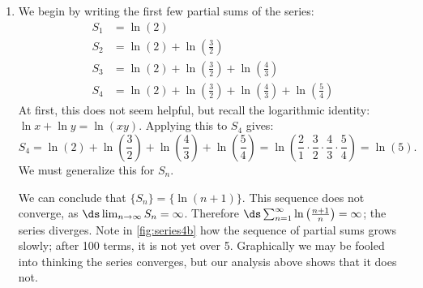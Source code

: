 \begin{example}
\begin{enumerate}
\item	We begin by writing the first few partial sums of the series:
\begin{align*}
S_1 &= \ln\left(2\right) \\
S_2 &= \ln\left(2\right)+\ln\left(\frac32\right) \\
S_3 &= \ln\left(2\right)+\ln\left(\frac32\right)+\ln\left(\frac43\right) \\
S_4 &= \ln\left(2\right)+\ln\left(\frac32\right)+\ln\left(\frac43\right)
+\ln\left(\frac54\right) 
\end{align*}
At first, this does not seem helpful, but recall the logarithmic identity: $\ln x+\ln y = \ln (xy).$ Applying this to $S_4$ gives:
\[
S_4 = \ln\left(2\right)+\ln\left(\frac32\right)+\ln\left(\frac43\right)
+\ln\left(\frac54\right)
=\ln\left(\frac21\cdot\frac32\cdot\frac43\cdot\frac54\right)
=\ln\left(5\right).
\]
We must generalize this for $S_n$.\\
\flushinnerequ{%
\[
S_n=\ln\left(2\right)+\ln\left(\frac32\right)+\dots +\ln \left(\frac{n+1}{n}\right)
=\ln\left(\frac21\cdot\frac32 \dots  \frac{n}{n-1}\cdot \frac{n+1}{n}\right)
=\ln(n+1)
\]}


We can conclude that $\{S_n\} = \bigl\{\ln (n+1)\bigr\}$. This sequence  does not converge, as $\ds \lim_{n\to\infty}S_n=\infty$. Therefore  $\ds\sum_{n=1}^\infty  \ln\left(\frac{n+1}{n}\right)=\infty$; the series diverges. Note in \autoref{fig:series4b} how the sequence of partial sums grows slowly; after 100 terms, it is not yet over 5. Graphically we may be fooled into thinking the series converges, but our analysis above shows that it does not.
\end{enumerate}
\end{example}

